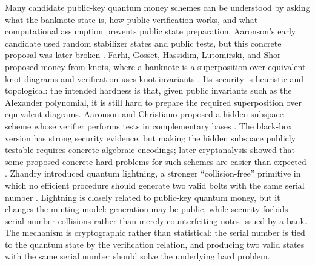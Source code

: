 \documentclass[12pt]{article}
\begin{document}
Many candidate public-key quantum money schemes can be understood by asking what the banknote state is, how public verification works, and what computational assumption prevents public state preparation.
Aaronson's early candidate used random stabilizer states and public tests, but this concrete proposal was later broken \cite{aaronsonQuantumCopyProtectionQuantum2009,lutomirskiBreakingMakingQuantum2009}.
Farhi, Gosset, Hassidim, Lutomirski, and Shor proposed money from knots, where a banknote is a superposition over equivalent knot diagrams and verification uses knot invariants \cite{farhiQuantumMoneyKnots2012}.
Its security is heuristic and topological: the intended hardness is that, given public invariants such as the Alexander polynomial, it is still hard to prepare the required superposition over equivalent diagrams.
Aaronson and Christiano proposed a hidden-subspace scheme whose verifier performs tests in complementary bases \cite{aaronsonChristianoQuantumMoneyHidden2012}.
The black-box version has strong security evidence, but making the hidden subspace publicly testable requires concrete algebraic encodings; later cryptanalysis showed that some proposed concrete hard problems for such schemes are easier than expected \cite{bilykCryptanalysisThreeQuantum2022}.
Zhandry introduced quantum lightning, a stronger ``collision-free'' primitive in which no efficient procedure should generate two valid bolts with the same serial number \cite{zhandryQuantumLightningNever2017a}.
Lightning is closely related to public-key quantum money, but it changes the minting model: generation may be public, while security forbids serial-number collisions rather than merely counterfeiting notes issued by a bank.
The mechanism is cryptographic rather than statistical: the serial number is tied to the quantum state by the verification relation, and producing two valid states with the same serial number should solve the underlying hard problem.
\end{document}
